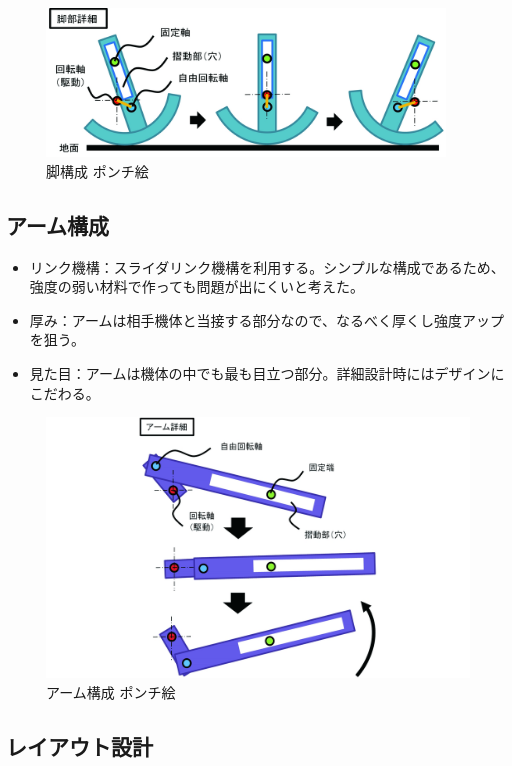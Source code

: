 \begin{figure}[htbp]
\centering
\includegraphics[width=300pt]{fig/fig02_cmyk.jpg}
\caption{脚構成 ポンチ絵}
\label{fig02}
\end{figure}

\subsection{アーム構成}\label{ux30a2ux30fcux30e0ux69cbux6210}

\begin{itemize}
\tightlist
\item
  リンク機構：スライダリンク機構を利用する。シンプルな構成であるため、強度の弱い材料で作っても問題が出にくいと考えた。
\item
  厚み：アームは相手機体と当接する部分なので、なるべく厚くし強度アップを狙う。
\item
  見た目：アームは機体の中でも最も目立つ部分。詳細設計時にはデザインにこだわる。
\end{itemize}

\begin{figure}[htbp]
\centering
\includegraphics[width=380pt]{fig/fig03_cmyk.jpg}
\caption{アーム構成 ポンチ絵}
\label{fig03}
\end{figure}

\subsection{レイアウト設計}\label{ux30ecux30a4ux30a2ux30a6ux30c8ux8a2dux8a08}

